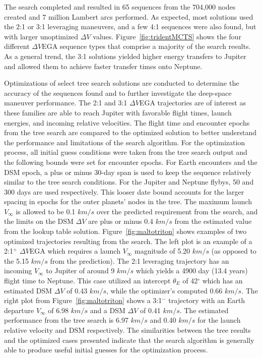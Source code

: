 \documentclass[letterpaper, preprint, paper,11pt]{AAS}	%
\begin{document}
The search completed and resulted in 65 sequences from the 704,000 nodes created and 7 million Lambert arcs performed. As expected, most solutions used the 2:1 or 3:1 leveraging maneuvers, and a few 4:1 sequences were also found, but with larger unoptimized $\Delta V$ values. Figure~\ref{fig:tridentMCTS} shows the four different $\Delta V$EGA sequence types that comprise a majority of the search results. As a general trend, the 3:1 solutions yielded higher energy transfers to Jupiter and allowed them to achieve faster transfer times onto Neptune.

Optimizations of select tree search solutions are conducted to determine the accuracy of the sequences found and to further investigate the deep-space maneuver performance. The 2:1 and 3:1 $\Delta V$EGA trajectories are of interest as these families are able to reach Jupiter with favorable flight times, launch energies, and incoming relative velocities. The flight time and encounter epochs from the tree search are compared to the optimized solution to better understand the performance and limitations of the search algorithm. For the optimization process, all initial guess conditions were taken from the tree search output and the following bounds were set for encounter epochs. For Earth encounters and the DSM epoch, a plus or minus 30-day span is used to keep the sequence relatively similar to the tree search conditions. For the Jupiter and Neptune flybys, 50 and 300 days are used respectively. This looser date bound accounts for the larger spacing in epochs for the outer planets' nodes in the tree. The maximum launch $V_\infty$ is allowed to be 0.1 $km/s$ over the predicted requirement from the search, and the limits on the DSM $\Delta V$ are plus or minus 0.4 $km/s$ from the estimated value from the lookup table solution. Figure~\ref{fig:maltotriton} shows examples of two optimized trajectories resulting from the search. The left plot is an example of a 2:1$^{+}$ $\Delta V$EGA which requires a launch $V_\infty$ magnitude of 5.20 $km/s$ (as opposed to the \hspace{0.5px} 5.15 $km/s$ from the prediction). The 2:1 leveraging trajectory has an incoming $V_\infty$ to Jupiter of around 9 $km/s$ which yields a 4900 day (13.4 years) flight time to Neptune. This case utilized an intercept $\theta_E$ of 42$^\circ$ which has an estimated DSM $\Delta V$ of 0.43 $km/s$, while the optimizer's computed 0.66 $km/s$. The right plot from Figure~\ref{fig:maltotriton} shows a 3:1$^{-}$ trajectory with an Earth departure $V_\infty$ of 6.98 $km/s$ and a DSM $\Delta V$ of 0.41 $km/s$. The estimated performance from the tree search is 6.97 $km/s$ and 0.40 $km/s$ for the launch relative velocity and DSM respectively. The similarities between the tree results and the optimized cases presented indicate that the search algorithm is generally able to produce useful initial guesses for the optimization process.
\end{document}
